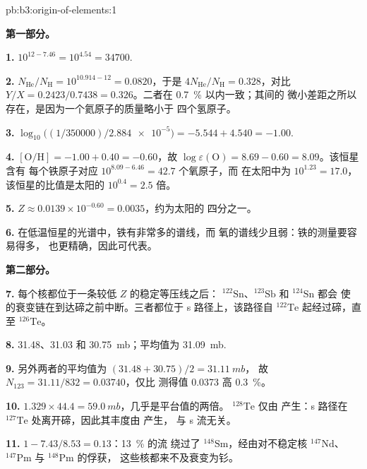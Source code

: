 \begin{solution}{pb:b3:origin-of-elements:1}

\textbf{第一部分。}

\textbf{1.} $10^{12 - 7.46} = 10^{4.54} = \num{34700}$.

\textbf{2.} $N_\mathrm{He}/N_\mathrm{H} = 10^{10.914 - 12} = \num{0.0820}$，于是
$4N_\mathrm{He}/N_\mathrm{H} = \num{0.328}$，对比 $Y/X =
0.2423/0.7438 = \num{0.326}$。二者在 \qty{0.7}{\percent} 以内一致；其间的
微小差距之所以存在，是因为一个氦原子的质量略小于
四个氢原子。

\textbf{3.} $\log_{10}\bigl((1/350000)/\num{2.884e-5}\bigr) = -5.544 + 4.540 =
-1.00$.

\textbf{4.} $[\mathrm{O/H}] = -1.00 + 0.40 = -0.60$，故
$\log\varepsilon(\mathrm{O}) = 8.69 - 0.60 = 8.09$。该恒星含有
每个铁原子对应 $10^{8.09 - 6.46} = 42.7$ 个氧原子，而
在太阳中为 $10^{1.23} = 17.0$，该恒星的比值是太阳的 $10^{0.4} = 2.5$ 倍。

\textbf{5.} $Z \approx 0.0139\times10^{-0.60} = \num{0.0035}$，约为太阳的
四分之一。

\textbf{6.} 在低温恒星的光谱中，铁有非常多的谱线，而
氧的谱线少且弱：铁的测量要容易得多，
也更精确，因此可代表。

\textbf{第二部分。}

\textbf{7.} 每个核都位于一条较低 $Z$ 的稳定等压线之后：
$^{122}\mathrm{Sn}$、$^{123}\mathrm{Sb}$ 和 $^{124}\mathrm{Sn}$ 都会
使 的衰变链在到达碲之前中断。三者都位于
s 路径上，该路径自 $^{122}\mathrm{Te}$ 起经过碲，直至
$^{126}\mathrm{Te}$。

\textbf{8.} \num{31.48}、\num{31.03} 和 \qty{30.75}{mb}；平均值为
\qty{31.09}{mb}.

\textbf{9.} 另外两者的平均值为 $(31.48 + 30.75)/2 = \qty{31.11}{mb}$，
故 $N_{123} = 31.11/832 = \num{0.03740}$，仅比
测得值 \num{0.0373} 高 \qty{0.3}{\percent}。

\textbf{10.} $1.329\times44.4 = \qty{59.0}{mb}$，几乎是平台值的两倍。
$^{128}\mathrm{Te}$ 仅由 产生：s 路径在
$^{127}\mathrm{Te}$ 处离开碲，因此其丰度由 产生，
与 s 流无关。

\textbf{11.} $1 - 7.43/8.53 = \num{0.13}$：\qty{13}{\percent} 的流
绕过了 $^{148}\mathrm{Sm}$，经由对不稳定核
$^{147}\mathrm{Nd}$、$^{147}\mathrm{Pm}$ 与 $^{148}\mathrm{Pm}$ 的俘获，
这些核都来不及衰变为钐。


\end{solution}
